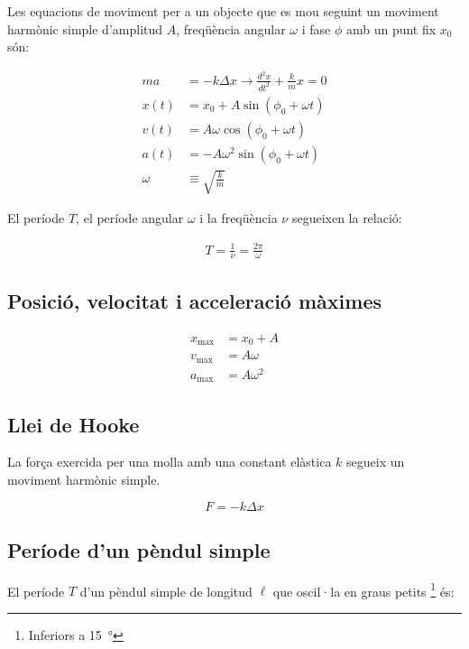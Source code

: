 Les equacions de moviment per a un objecte que es mou seguint un moviment harmònic simple d'amplitud $A$, freqüència angular $\omega$ i fase $\phi$ amb un punt fix $x_0$són:

\begin{align}
    ma &= -k\Delta x \longrightarrow \frac{d^2x}{dt^2} + \frac{k}{m}x = 0 \nonumber \\
    x(t) &= x_0 + A\sin(\phi_0+\omega t) \\
    v(t) &= A\omega\cos(\phi_0+\omega t) \\
    a(t) &= -A\omega^2\sin(\phi_0+\omega t) \\
    \omega &\equiv \sqrt{\frac{k}{m}}
\end{align}

El període $T$, el període angular $\omega$ i la freqüència $\nu$ segueixen la
relació:

\begin{align}
    T = \frac{1}{\nu} = \frac{2\pi}{\omega}
\end{align}

\subsection{Posició, velocitat i acceleració màximes}
\label{sub:posicio_velocitat_i_acceleracio_maximes}


\begin{align}
    x_\mathrm{max} &= x_0 + A \\
    v_\mathrm{max} &= A\omega \\
    a_\mathrm{max} &= A\omega^2
\end{align}

\subsection{Llei de Hooke}
\label{sub:llei_de_hooke}

La força exercida per una molla amb una constant elàstica $k$ segueix un
moviment harmònic simple.

\begin{equation}
    F = -k\Delta x
\end{equation}

\subsection{Període d'un pèndul simple}
\label{sub:periode_d_un_pendul_simple}

El període $T$ d'un pèndul simple de longitud $\ell$ que oscil·la en graus petits \footnote{Inferiors a \SI{15}{\degree}} és:

